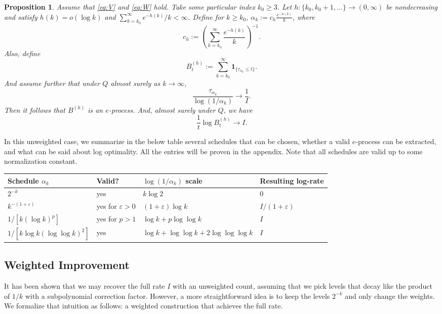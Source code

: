 \documentclass{article}
\newcommand{\ind}[1]{\mathbf{1}_{\{#1\}}}
\newtheorem{proposition}[theorem]{Proposition}
\theoremstyle{definition}
\begin{document}
\begin{proposition}\label{prop:general-h}
Assume that \eqref{eq:V} and \eqref{eq:W} hold. Take some particular index $k_0\ge 3$. Let $h:\{k_0, k_0+1, \dots\}\to (0,\infty)$ be nondecreasing and satisfy $h(k)=o(\log k)$ and $\sum_{k=k_0}^\infty e^{-h(k)}/k <\infty$. Define for $k\ge k_0$, $\alpha_k:=c_h\frac{e^{-h(k)}}{k}$, where
\[
c_h:=\left(\sum_{k=k_0}^\infty \frac{e^{-h(k)}}{k}\right)^{-1}.
\]
Also, define
\[
B_t^{(h)}:=\sum_{k=k_0}^\infty \ind{\tau_{\alpha_k}\le t}.
\]
And assume further that under $Q$ almost surely as $k\to\infty$,
\[
\frac{\tau_{\alpha_k}}{\log(1/\alpha_k)}\longrightarrow \frac{1}{I}.
\]
Then it follows that $B^{(h)}$ is an $e$-process. And, almost surely under $Q$, we have
\[
\boxed{
\frac{1}{t}\log B_t^{(h)} \longrightarrow I.
}
\]
\end{proposition}

In this unweighted case, we summarize in the below table several schedules that can be chosen, whether a valid $e$-process can be extracted, and what can be said about log optimality. All the entries will be proven in the appendix. Note that all schedules are valid up to some normalization constant.

\begin{center}
\begin{tabular}{@{}llll@{}}
\toprule
Schedule $\alpha_k$ & Valid? & $\log(1/\alpha_k)$ scale & Resulting log-rate\\ \midrule
$2^{-k}$ & yes & $k\log 2$ & $0$\\
$k^{-(1+\varepsilon)}$ & yes for $\varepsilon>0$ & $(1+\varepsilon)\log k$ & $I/(1+\varepsilon)$\\
$1/[k(\log k)^p]$ & yes for $p>1$ & $\log k + p\log\log k$ & $I$\\
$1/[k\log k(\log\log k)^2]$ & yes & $\log k + \log\log k + 2\log\log\log k$ & $I$\\
\bottomrule
\end{tabular}    
\end{center}

\subsection*{Weighted Improvement}
It has been shown that we may recover the full rate $I$ with an unweighted count, assuming that we pick levels that decay like the product of $1/k$ with a subpolynomial correction factor. However, a more straightforward idea is to keep the levels $2^{-k}$ and only change the weights. We formalize that intuition as follows: a weighted construction that achieves the full rate.
\end{document}
